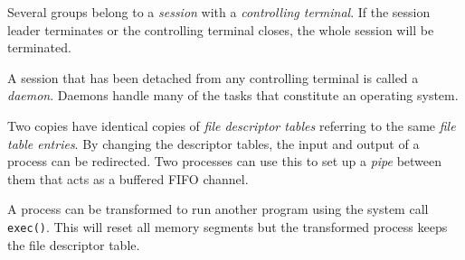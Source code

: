 \documentclass[a4paper,11pt]{article}
\begin{document}
Several groups belong to a {\em session} with a {\em controlling
  terminal}. If the session leader terminates or the controlling
terminal closes, the whole session will be terminated. 

A session that has been detached from any controlling terminal is
called a {\em daemon}. Daemons handle many of the tasks that
constitute an operating system.

Two copies have identical copies of {\em file descriptor tables}
referring to the same {\em file table entries}. By changing the
descriptor tables, the input and output of a process can be
redirected. Two processes can use this to set up a {\em pipe} between
them that acts as a buffered FIFO channel. 

A process can be transformed to run another program using the system
call {\tt exec()}. This will reset all memory segments but the
transformed process keeps the file descriptor table. 
\end{document}
